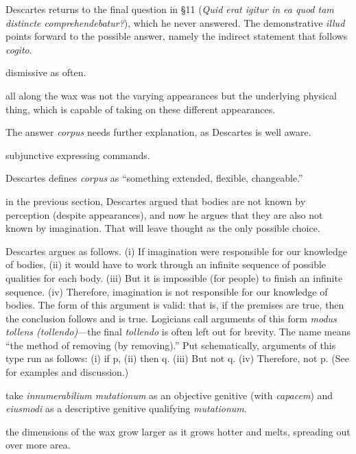 Descartes returns to the final question in §11 (\textit{Quid erat igitur in ea quod tam distincte comprehendebatur?}), which he never answered. The demonstrative \textit{illud} points forward to the possible answer, namely the indirect statement that follows \textit{cogito}.

 dismissive as often.

 all along the wax was not the varying appearances but the underlying physical thing, which is capable of taking on these different appearances.

 The answer \textit{corpus} needs further explanation, as Descartes is well aware.

 subjunctive expressing commands.

 Descartes defines \textit{corpus} as ``something extended, flexible, changeable.''

 in the previous section, Descartes argued that bodies are not known by perception (despite appearances), and now he argues that they are also not known by imagination. That will leave thought as the only possible choice.

 Descartes argues as follows. (i) If imagination were responsible for our knowledge of bodies, (ii) it would have to work through an infinite sequence of possible qualities for each body. (iii) But it is impossible (for people) to finish an infinite sequence. (iv) Therefore, imagination is not responsible for our knowledge of bodies. The form of this argument is valid: that is, if the premises are true, then the conclusion follows and is true. Logicians call arguments of this form \textit{modus tollens (tollendo)}---the final \textit{tollendo} is often left out for brevity. The name means ``the method of removing (by removing).'' Put schematically, arguments of this type run as follows: (i) if p, (ii) then q. (iii) But not q. (iv) Therefore, not p. (See \cite[§23]{weston2009} for examples and discussion.)

 take \textit{innumerabilium mutationum} as an objective genitive (with \textit{capacem}) and \textit{eiusmodi} as a descriptive genitive qualifying \textit{mutationum}.

 the dimensions of the wax grow larger as it grows hotter and melts, spreading out over more area.


